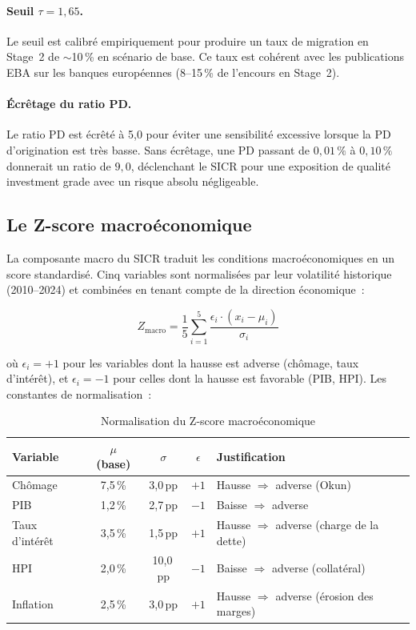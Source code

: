 \documentclass[12pt, a4paper, twoside, openright]{report}
\theoremstyle{definition}
\begin{document}
\paragraph{Seuil $\tau = 1{,}65$.} Le seuil est calibré empiriquement pour produire un taux de migration en Stage~2 de $\sim$10\,\% en scénario de base. Ce taux est cohérent avec les publications EBA sur les banques européennes (8--15\,\% de l'encours en Stage~2).

\paragraph{Écrêtage du ratio PD.} Le ratio PD est écrêté à 5{,}0 pour éviter une sensibilité excessive lorsque la PD d'origination est très basse. Sans écrêtage, une PD passant de $0{,}01\,\%$ à $0{,}10\,\%$ donnerait un ratio de $9{,}0$, déclenchant le SICR pour une exposition de qualité investment grade avec un risque absolu négligeable.

\subsection{Le Z-score macroéconomique}

La composante macro du SICR traduit les conditions macroéconomiques en un score standardisé. Cinq variables sont normalisées par leur volatilité historique (2010--2024) et combinées en tenant compte de la direction économique~:

\begin{equation}
Z_{\text{macro}} = \frac{1}{5} \sum_{i=1}^{5} \frac{\epsilon_i \cdot (x_i - \mu_i)}{\sigma_i}
\label{eq:z-macro}
\end{equation}

\noindent où $\epsilon_i = +1$ pour les variables dont la hausse est adverse (chômage, taux d'intérêt), et $\epsilon_i = -1$ pour celles dont la hausse est favorable (PIB, HPI). Les constantes de normalisation~:

\begin{table}[htbp]
\centering
\caption{Normalisation du Z-score macroéconomique}
\label{tab:z-norm}
\begin{tabular}{lcccl}
\toprule
Variable & $\mu$ (base) & $\sigma$ & $\epsilon$ & Justification \\
\midrule
Chômage & 7{,}5\,\% & 3{,}0\,pp & $+1$ & Hausse $\Rightarrow$ adverse (Okun) \\
PIB & 1{,}2\,\% & 2{,}7\,pp & $-1$ & Baisse $\Rightarrow$ adverse \\
Taux d'intérêt & 3{,}5\,\% & 1{,}5\,pp & $+1$ & Hausse $\Rightarrow$ adverse (charge de la dette) \\
HPI & 2{,}0\,\% & 10{,}0\,pp & $-1$ & Baisse $\Rightarrow$ adverse (collatéral) \\
Inflation & 2{,}5\,\% & 3{,}0\,pp & $+1$ & Hausse $\Rightarrow$ adverse (érosion des marges) \\
\bottomrule
\end{tabular}
\end{table}
\end{document}
